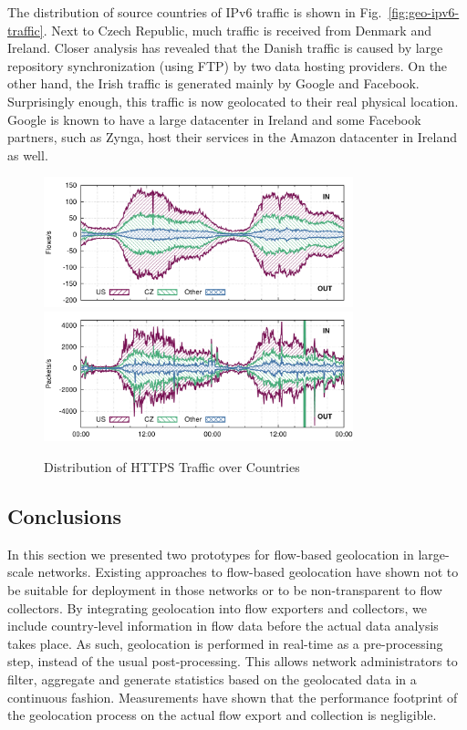 The distribution of source countries of IPv6 traffic is shown in Fig.~\ref{fig:geo-ipv6-traffic}. Next to Czech Republic, much traffic is received from Denmark and Ireland. Closer analysis has revealed that the Danish traffic is caused by large repository synchronization (using FTP) by two data hosting providers. On the other hand, the Irish traffic is generated mainly by Google and Facebook. Surprisingly enough, this traffic is now geolocated to their real physical location. Google is known to have a large datacenter in Ireland and some Facebook partners, such as Zynga, host their services in the Amazon datacenter in Ireland as well.

\begin{figure}[!tb]
    \centering
    \includegraphics[width=0.8\textwidth]{figures/paper-geolocation/https/flows}
    \includegraphics[width=0.8\textwidth]{figures/paper-geolocation/https/packets}
    \caption{Distribution of HTTPS Traffic over Countries}
    \label{fig:geo-https-traffic}
\end{figure}

\subsection{Conclusions} \label{subsec:geo-conclusions}

In this section we presented two prototypes for flow-based geolocation in large-scale networks. Existing approaches to flow-based geolocation have shown not to be suitable for deployment in those networks or to be non-transparent to flow collectors. By integrating geolocation into flow exporters and collectors, we include country-level information in flow data before the actual data analysis takes place. As such, geolocation is performed in real-time as a pre-processing step, instead of the usual post-processing. This allows network administrators to filter, aggregate and generate statistics based on the geolocated data in a continuous fashion. Measurements have shown that the performance footprint of the geolocation process on the actual flow export and collection is negligible.

